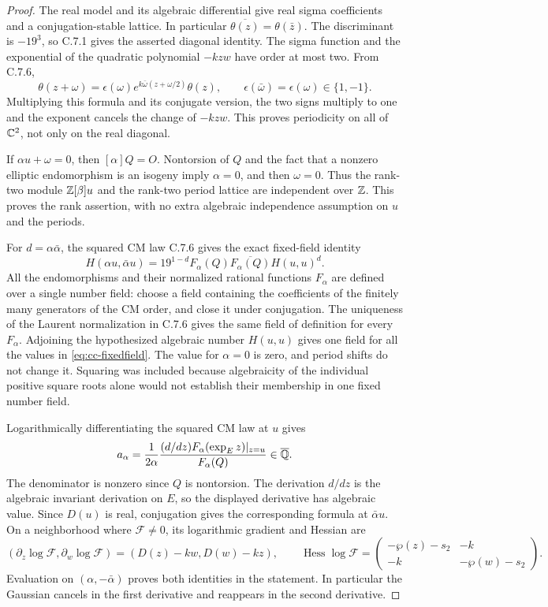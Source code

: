 \begin{proof}
The real model and its algebraic differential give real sigma
coefficients and a conjugation-stable lattice. In particular
$\overline{\theta(z)}=\theta(\bar z)$. The discriminant is
$-19^3$, so C.7.1 gives the asserted diagonal identity.
The sigma function and the exponential of the quadratic
polynomial $-kzw$ have order at most two. From C.7.6,
\[
 \theta(z+\omega)=\epsilon(\omega)
         e^{k\bar\omega(z+\omega/2)}\theta(z),
 \qquad \epsilon(\bar\omega)=\epsilon(\omega)\in\{1,-1\}.
\]
Multiplying this formula and its conjugate version, the two
signs multiply to one and the exponent cancels the change of
$-kzw$. This proves periodicity on all of $\mathbb C^2$, not only
on the real diagonal.

If $\alpha u+\omega=0$, then $[\alpha]Q=O$.
Nontorsion of $Q$ and the fact that a nonzero elliptic
endomorphism is an isogeny imply $\alpha=0$, and then
$\omega=0$. Thus the rank-two module $\mathbb Z[\beta]u$ and the
rank-two period lattice are independent over $\mathbb Z$.
This proves the rank assertion, with no extra algebraic
independence assumption on $u$ and the periods.

For $d=\alpha\bar\alpha$, the squared CM law C.7.6 gives
the exact fixed-field identity
\begin{equation}\label{eq:cc-fixedfield}
 H(\alpha u,\bar\alpha u)
   =19^{1-d}F_\alpha(Q)\overline{F_\alpha(Q)}H(u,u)^d.
\end{equation}
All the endomorphisms and their normalized rational functions
$F_\alpha$ are defined over a single number field: choose
a field containing the coefficients of the finitely many
generators of the CM order, and close it under conjugation.
The uniqueness of the Laurent normalization in C.7.6 gives
the same field of definition for every $F_\alpha$.
Adjoining the hypothesized algebraic number $H(u,u)$ gives
one field for all the values in \eqref{eq:cc-fixedfield}.
The value for $\alpha=0$ is zero, and period shifts do not
change it. Squaring was included because algebraicity of the
individual positive square roots alone would not establish
their membership in one fixed number field.

Logarithmically differentiating the squared CM law at $u$
gives
\[
 a_\alpha=\frac{1}{2\alpha}
     \frac{(d/dz)F_\alpha(\exp_Ez)|_{z=u}}{F_\alpha(Q)}
                  \in\overline{\mathbb Q}.
\]
The denominator is nonzero since $Q$ is nontorsion. The
derivation $d/dz$ is the algebraic invariant derivation on
$E$, so the displayed derivative has algebraic value.
Since $D(u)$ is real, conjugation gives the corresponding
formula at $\bar\alpha u$. On a neighborhood where
$\mathcal F\ne0$, its logarithmic gradient and Hessian are
\[
 (\partial_z\log\mathcal F,\partial_w\log\mathcal F)
       =(D(z)-kw,D(w)-kz),\qquad
 \operatorname{Hess}\log\mathcal F=
 \begin{pmatrix}-\wp(z)-s_2&-k\\-k&-\wp(w)-s_2\end{pmatrix}.
\]
Evaluation on $(\alpha,-\bar\alpha)$ proves both identities
in the statement. In particular the Gaussian cancels in the
first derivative and reappears in the second derivative.


\end{proof}
